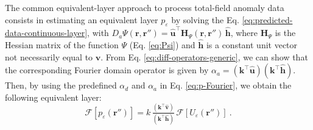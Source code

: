 The common equivalent-layer approach to process total-field anomaly data consists in 
estimating an equivalent layer $p_{\varepsilon}$ by solving the Eq. 
\ref{eq:predicted-data-continuous-layer},
with $D_{a}\Psi(\mathbf{r}, \mathbf{r}'') = \hat{\mathbf{u}}^{\top} \mathbf{H}_{\Psi}(\mathbf{r}, \mathbf{r}'') \, \hat{\mathbf{h}}$, 
where $\mathbf{H}_{\Psi}$ is the Hessian matrix \citep[e.g.,][p. 158]{kaplan2002} of the 
function $\Psi$ (Eq. \ref{eq:Psi}) and $\hat{\mathbf{h}}$ is a constant unit vector not 
necessarily equal to $\hat{\mathbf{v}}$. From Eq. \ref{eq:diff-operators-generic}, we can 
show that the corresponding Fourier domain operator is given by 
$\alpha_{a} = \left(\mathbf{k}^{\top} \hat{\mathbf{u}} \right)\left(\mathbf{k}^{\top} \hat{\mathbf{h}} \right)$.
Then, by using the predefined $\alpha_{d}$ and $\alpha_{a}$ in Eq. \ref{eq:p-Fourier}, we 
obtain the following equivalent layer:
\begin{equation}
	\mathcal{F} [ p_{\varepsilon}(\mathbf{r}'') ] =
	k \, \tfrac{
		\left(\mathbf{k}^{\top} \hat{\mathbf{v}} \right)
		}{
		\left(\mathbf{k}^{\top} \hat{\mathbf{h}} \right)
		} \,
	\mathcal{F} \left[ U_{\varepsilon}(\mathbf{r}'') \right] \: .
	\label{eq:p-Fourier-dipoles}
\end{equation}

